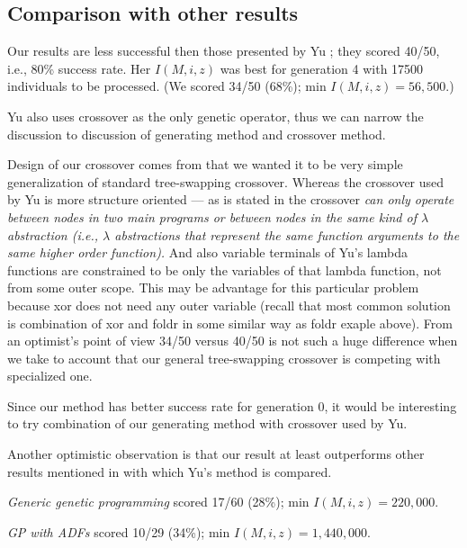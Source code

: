 \documentclass[12pt,a4paper]{report}
\newenvironment{todo}
{ ~\\[0.5em]
  {\color{red}\textbf{TODO}}
  \begin{easylist}[itemize]}
{ \end{easylist}
  ~}
\begin{document}
\subsection{Comparison with other results}

Our results are less successful then those 
presented by Yu \cite{yu01};
they scored 40/50, i.e., 80\% success rate.  
Her $I(M,i,z)$ was best for generation 4 with 17500 
individuals to be processed.
(We scored 34/50 (68\%); min $I(M,i,z) = 56,500$.)

Yu also uses crossover as the only genetic operator, thus we
can narrow the discussion to discussion of generating method and 
crossover method. 


Design of our crossover comes from that we wanted it to be
very simple generalization of standard tree-swapping crossover.
Whereas the crossover used by Yu is more structure oriented
--- as is stated in \cite{yu01} the crossover \textit{can only operate 
between nodes in two main programs or between nodes in the same
kind of $\lambda$ abstraction (i.e., $\lambda$ abstractions that 
represent the same function arguments to the same higher order function).} And also variable terminals of Yu's lambda functions
are constrained to be only the variables of that lambda function, not from some outer scope. This may be advantage for this particular problem because xor does not need any outer variable
(recall that most common solution is combination of xor and foldr in some similar way as foldr exaple above).
From an optimist's point of view 34/50 versus 40/50 
is not such a huge difference when we take to account that
our general tree-swapping crossover is competing with specialized one.   

Since our method has better success rate for generation 0, it would 
be interesting to try combination of our generating 
method with crossover used by Yu.


Another optimistic observation is that our result at least outperforms 
other results mentioned in \cite{yu01} with which Yu's method is compared.


\textit{Generic genetic programming} scored 17/60 (28\%); 
min $I(M,i,z) = 220,000$.

\textit{GP with ADFs} scored 10/29 (34\%); 
min $I(M,i,z) = 1,440,000$.

%
%
%
\end{document}
